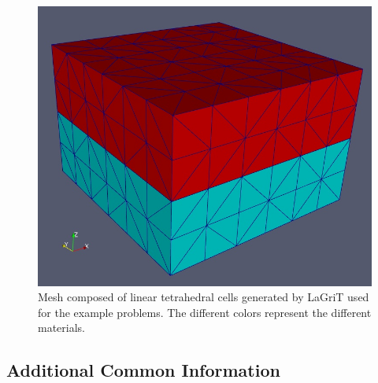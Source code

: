 \noindent \begin{center}
\begin{figure}
\begin{centering}
\includegraphics[scale=0.45]{tutorials/3dtet4/figs/tet4-mesh}
\par\end{centering}

\caption{Mesh composed of linear tetrahedral cells generated by LaGriT used
for the example problems. The different colors represent the different
materials.\label{fig:3dtet4-mesh}}
\end{figure}

\par\end{center}


\subsection{Additional Common Information}

